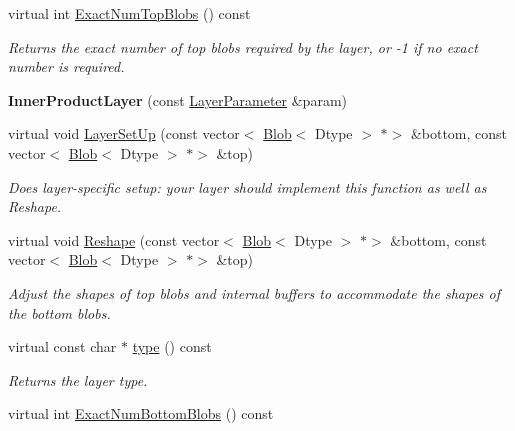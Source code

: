 \begin{DoxyCompactItemize}
virtual int \mbox{\hyperlink{classcaffe_1_1_inner_product_layer_a652d8a5b07b72938a81f50305c1a8ee1}{Exact\+Num\+Top\+Blobs}} () const
\begin{DoxyCompactList}\small\item\em Returns the exact number of top blobs required by the layer, or -\/1 if no exact number is required. \end{DoxyCompactList}\item 
\mbox{\label{classcaffe_1_1_inner_product_layer_a997e3c54ed0414ebcd8eec13f083af07}} 
{\bfseries Inner\+Product\+Layer} (const \mbox{\hyperlink{classcaffe_1_1_layer_parameter}{Layer\+Parameter}} \&param)
\item 
virtual void \mbox{\hyperlink{classcaffe_1_1_inner_product_layer_a35643c908323b6341101db342e4e78ee}{Layer\+Set\+Up}} (const vector$<$ \mbox{\hyperlink{classcaffe_1_1_blob}{Blob}}$<$ Dtype $>$ $\ast$$>$ \&bottom, const vector$<$ \mbox{\hyperlink{classcaffe_1_1_blob}{Blob}}$<$ Dtype $>$ $\ast$$>$ \&top)
\begin{DoxyCompactList}\small\item\em Does layer-\/specific setup\+: your layer should implement this function as well as Reshape. \end{DoxyCompactList}\item 
virtual void \mbox{\hyperlink{classcaffe_1_1_inner_product_layer_a12915397170ea81ccc0bce177897d4ba}{Reshape}} (const vector$<$ \mbox{\hyperlink{classcaffe_1_1_blob}{Blob}}$<$ Dtype $>$ $\ast$$>$ \&bottom, const vector$<$ \mbox{\hyperlink{classcaffe_1_1_blob}{Blob}}$<$ Dtype $>$ $\ast$$>$ \&top)
\begin{DoxyCompactList}\small\item\em Adjust the shapes of top blobs and internal buffers to accommodate the shapes of the bottom blobs. \end{DoxyCompactList}\item 
\mbox{\label{classcaffe_1_1_inner_product_layer_af10fcfd9a34e23809c4374633c174bee}} 
virtual const char $\ast$ \mbox{\hyperlink{classcaffe_1_1_inner_product_layer_af10fcfd9a34e23809c4374633c174bee}{type}} () const
\begin{DoxyCompactList}\small\item\em Returns the layer type. \end{DoxyCompactList}\item 
virtual int \mbox{\hyperlink{classcaffe_1_1_inner_product_layer_a5afdeb6b448b2f7d0637afa554381500}{Exact\+Num\+Bottom\+Blobs}} () const

\end{DoxyCompactItemize}
